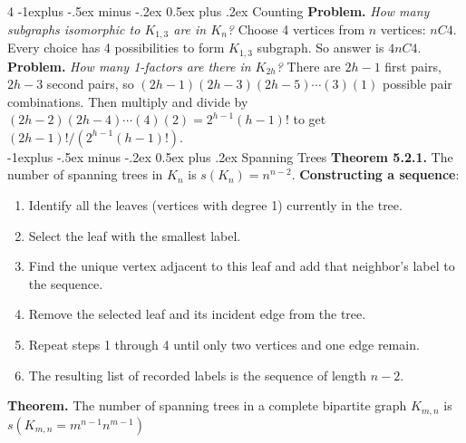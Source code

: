 \documentclass[letterpaper, 8pt]{extarticle}
\makeatletter
\renewcommand{\section}{\@startsection{section}{1}{0mm}%
	{-1explus -.5ex minus -.2ex}%
	{0.5ex plus .2ex}%
	{\normalfont\normalsize\bfseries}}
\makeatother
\begin{document}
\begin{multicols*}{4}
	\section{Counting}
	\textbf{Problem.} \textit{How many subgraphs isomorphic to $K_{1,3}$ are in $K_n$?} Choose 4 vertices from $n$ vertices: $nC4$. Every choice has 4 possibilities to form $K_{1,3}$ subgraph. So answer is $4 nC4$. \\
	\textbf{Problem.} \textit{How many 1-factors are there in $K_{2h}$?} There are $2h-1$ first pairs, $2h-3$ second pairs, so $(2h-1)(2h-3)(2h-5) \cdots (3)(1)$ possible pair combinations. Then multiply and divide by $(2h-2)(2h-4) \cdots (4)(2) = 2^{h-1}(h-1)!$ to get $(2h-1)!/(2^{h-1}(h-1)!)$. \\
	\section{Spanning Trees}
	\textbf{Theorem 5.2.1.} The number of spanning trees in $K_n$ is $s(K_n) = n^{n-2}$.
	\textbf{Constructing a sequence}:
	\begin{enumerate}
		\item Identify all the leaves (vertices with degree 1) currently in the tree.
		\item Select the leaf with the smallest label.
		\item Find the unique vertex adjacent to this leaf and add that neighbor's label to the sequence.
		\item Remove the selected leaf and its incident edge from the tree.
		\item Repeat steps 1 through 4 until only two vertices and one edge remain.
		\item The resulting list of recorded labels is the sequence of length $n-2$.
	\end{enumerate}
	\textbf{Theorem.} The number of spanning trees in a complete bipartite graph $K_{m,n}$ is $s(K_{m,n} = m^{n-1}n^{m-1})$ \\


\end{multicols*}
\end{document}
